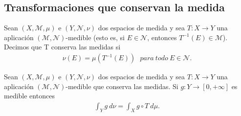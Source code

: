 \subsection{Transformaciones que conservan la medida}
\begin{defi}
    Sean $(X, \mathcal{M}, \mu)$ e $(Y, \mathcal{N},\nu)$ dos espacios de medida y sea $T: X \longrightarrow Y$ una aplicación $(\mathcal{M},\mathcal{N})$-medible (esto es, si $E \in \mathcal{N}$, entonces $T^{-1}(E) \in \mathcal{M}$). Decimos que T conserva las medidas si
    \begin{align*}
        \nu(E) = \mu(T^{-1}(E)) \ \ \ para \ todo \ E \in \mathcal{N}.
    \end{align*}
\end{defi}

\begin{prop}
    Sean $(X, \mathcal{M}, \mu)$ e $(Y, \mathcal{N},\nu)$ dos espacios de medida y sea $T: X \longrightarrow Y$ una aplicación $(\mathcal{M},\mathcal{N})$-medible que conserva las medidas. Si $g: Y \longrightarrow [0,+\infty]$ es medible entonces
    \begin{align*}
        \int_{Y}{g \ d\nu} = \int_{X}{g \circ T \ d\mu}.
    \end{align*}
\end{prop}

